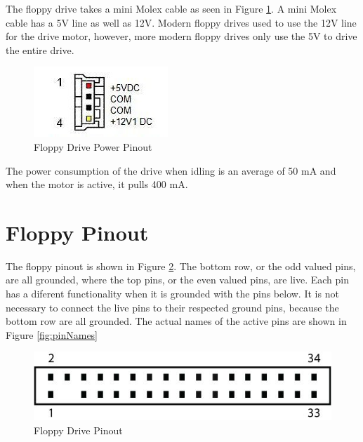 \documentclass[11pt, a4paper]{report}
\begin{document}
The floppy drive takes a mini Molex cable as seen in Figure \ref{fig:miniMolex}. A mini Molex cable has a 5V line as well as 12V. Modern floppy drives used to use the 12V line for the drive motor, however, more modern floppy drives only use the 5V to drive the entire drive. \\

\begin{figure}[H]
\hspace*{-2cm}    
    \centering
    \includegraphics[width=.3\textwidth]{miniMolex.jpg}
    \caption{Floppy Drive Power Pinout}
    \label{fig:miniMolex}
\end{figure}


The power consumption of the drive when idling is an average of 50 mA and when the motor is active, it pulls 400 mA. \\


\section{Floppy Pinout}

The floppy pinout is shown in Figure \ref{fig:pinOut}. The bottom row, or the odd valued pins, are all grounded, where the top pins, or the even valued pins, are live. Each pin has a diferent functionality when it is grounded with the pins below. It is not necessary to connect the live pins to their respected ground pins, because the bottom row are all grounded. The actual names of the active pins are shown in Figure \ref{fig:pinNames}
\begin{figure}[H]
\hspace*{-2cm}    
    \centering
    \includegraphics[width=.75\textwidth]{floppy_pinout.jpg}
    \caption{Floppy Drive Pinout}
    \label{fig:pinOut}
\end{figure}
\end{document}
